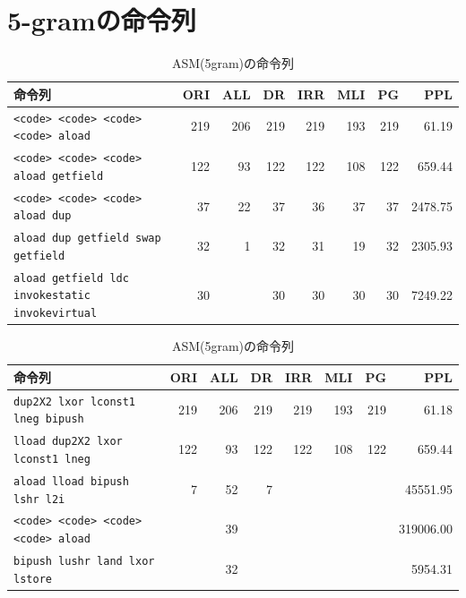 \documentclass[12pt,twoside]{jreport}
\begin{document}
\chapter{5-gramの命令列}
\begin{table}[t]
  \centering
  \footnotesize{
    \caption{ASM(5gram)の命令列}\label{table:asm}
  \begin{tabular}{lrrrrrrr}
   命令列 &
    \multicolumn{1}{p{1cm}}{ORI} & 
    \multicolumn{1}{p{1cm}}{ALL} & 
    \multicolumn{1}{p{1cm}}{DR} & 
    \multicolumn{1}{p{1cm}}{IRR} & 
    \multicolumn{1}{p{1cm}}{MLI} & 
    \multicolumn{1}{p{1cm}}{PG} & 
    \multicolumn{1}{p{1cm}}{PPL} \\ \hline
    \texttt{<code> <code> <code> <code> aload}             & 219 & 206 & 219 & 219 & 193 & 219 & 61.19 \\
    \texttt{<code> <code> <code> aload getfield}           & 122 &  93 & 122 & 122 & 108 & 122 & 659.44 \\
    \texttt{<code> <code> <code> aload dup}                & 37  &  22 &  37 &  36 &  37 &  37 & 2478.75 \\
    \texttt{aload dup getfield swap getfield} 　           & 32  &   1 &  32 &  31 &  19 &  32 & 2305.93 \\
    \texttt{aload getfield ldc invokestatic invokevirtual} & 30  &     &  30 &  30 &  30 &  30 & 7249.22 \\
  \end{tabular}
  
  \begin{tabular}{lrrrrrrr}
   命令列 &
    \multicolumn{1}{p{1cm}}{ORI} & 
    \multicolumn{1}{p{1cm}}{ALL} & 
    \multicolumn{1}{p{1cm}}{DR} & 
    \multicolumn{1}{p{1cm}}{IRR} & 
    \multicolumn{1}{p{1cm}}{MLI} & 
    \multicolumn{1}{p{1cm}}{PG} & 
    \multicolumn{1}{p{1cm}}{PPL} \\ \hline
    \texttt{dup2X2 lxor lconst1 lneg bipush}   & 219 & 206 & 219 & 219 & 193 & 219 & 61.18 \\
    \texttt{lload dup2X2 lxor lconst1 lneg}    & 122 &  93 & 122 & 122 & 108 & 122 & 659.44 \\
    \texttt{aload lload bipush lshr l2i}       & 7   &  52 &   7 &     &     &     & 45551.95 \\
    \texttt{<code> <code> <code> <code> aload} &     &  39 &     &     &     &     & 319006.00 \\
    \texttt{bipush lushr land lxor lstore}     &     &  32 &     &     &     &     & 5954.31 \\
  \end{tabular}
  
}
\end{table}
\end{document}
